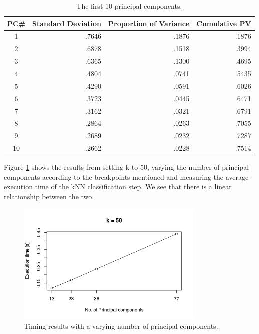 \documentclass[paper=a4, fontsize=11pt]{scrartcl} %
\begin{document}
\begin{table}[h]
\centering
\caption{The first 10 principal components.}
\label{tab:pca}
\begin{tabular}{|c|r|r|r|}
\hline
PC\# & Standard Deviation & Proportion of Variance & Cumulative PV \\ \hline
1    & .7646              & .1876                  & .1876         \\
2    & .6878              & .1518                  & .3994         \\
3    & .6365              & .1300                  & .4695         \\
4    & .4804              & .0741                  & .5435         \\
5    & .4290              & .0591                  & .6026         \\
6    & .3723              & .0445                  & .6471         \\
7    & .3162              & .0321                  & .6791         \\
8    & .2864              & .0263                  & .7055         \\
9    & .2689              & .0232                  & .7287         \\
10   & .2662              & .0228                  & .7514         \\ \hline
\end{tabular}
\end{table}

Figure \ref{fig:timing} shows the results from setting k to 50, varying the number of principal components according to the breakpoints mentioned and measuring the average execution time of the kNN classification step. We see that there is a linear relationship between the two.\par

\begin{figure}[h]
	\centering
	\includegraphics[width=0.8\textwidth]{timing.png}
	\caption{Timing results with a varying number of principal components.}
	\label{fig:timing}
\end{figure}
\end{document}
